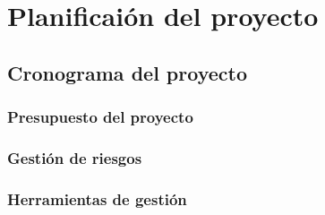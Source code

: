 \chapter{Planificaión del proyecto}\label{cap:planificacion}

\section{Cronograma del proyecto}

\subsection{Presupuesto del proyecto}

\subsection{Gestión de riesgos}

\subsection{Herramientas de gestión}
